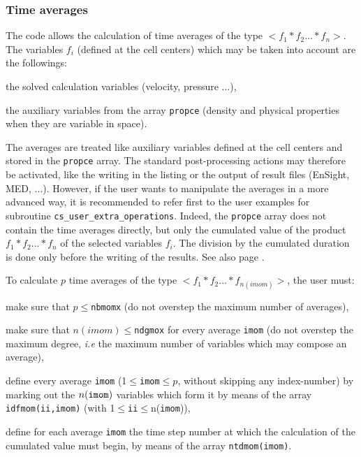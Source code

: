 \subsubsection{Time averages}

The code allows the calculation of time averages of the type
$<f_1*f_2...*f_n>$. The variables $f_i$ (defined at the cell centers)
which may be taken into account are the followings:
\begin{list}{-}{}
\item the solved calculation variables (velocity, pressure ...),
\item the auxiliary variables from the array {\tt propce} (density and
      physical properties when they are variable in space).
\end{list}

The averages are treated like auxiliary variables defined at the cell
centers and stored in the {\tt propce} array. The standard post-processing
actions may therefore be activated, like the writing in the listing or
the output of result files (EnSight, MED, ...). However, if the user
wants to manipulate the averages in a more advanced way, it is
recommended to refer first to the user examples for subroutine
\texttt{cs\_user\_extra\_operations}. Indeed, the {\tt propce} array
does not contain the time averages directly, but only the cumulated value
of the product $f_1*f_2...*f_n$ of the selected
variables $f_i$. The division by the cumulated duration is done only
before the writing of the results. See also page \pageref{prg_moyennes}.

To calculate $p$ time averages of the type $<f_1*f_2...*f_{n(imom)}>$,
the user must:
\begin{list}{-}{}
\item make sure that $p\leqslant${\tt nbmomx} (do not overstep the maximum
      number of averages),
\item make sure that $n(imom)\leqslant${\tt ndgmox} for every average {\tt imom}
       (do not overstep the maximum degree, {\it i.e} the maximum number
       of variables which may compose an average),
\item define every average {\tt imom} (1$\leqslant${\tt imom}$\leqslant p$,
      without skipping any index-number) by marking out the $n({\tt imom})$
      variables which form it by means of the array {\tt idfmom(ii,imom)} (with
      1$\leqslant${\tt ii}$\leqslant$n({\tt imom})),
\item define for each average {\tt imom} the time step number at which the
      calculation of the cumulated value must begin, by means of the
      array {\tt ntdmom(imom)}.
\end{list}

